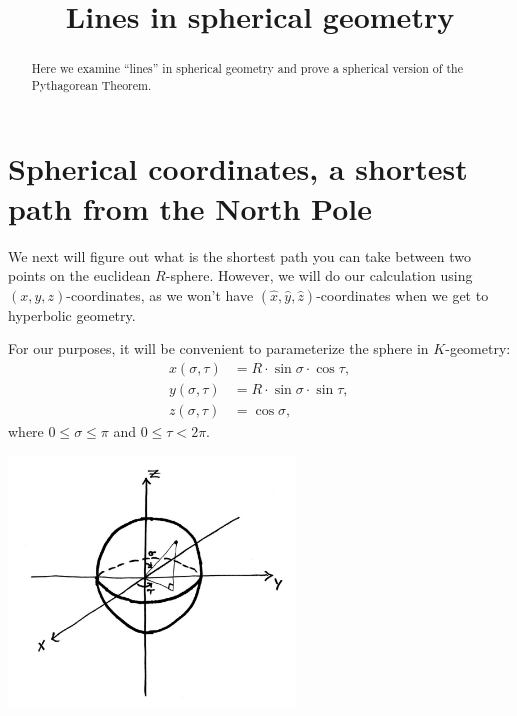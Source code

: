 \documentclass[newpage,hints,handout]{ximera}
\title{Lines in spherical geometry}
\begin{document}
\begin{abstract}
Here we examine ``lines'' in spherical geometry and prove a spherical
version of the Pythagorean Theorem.
\end{abstract}
\maketitle


\section{Spherical coordinates, a shortest path from the North Pole}

We next will figure out what is the shortest path you can take between
two points on the euclidean $R$-sphere. However, we will do our
calculation using $(x,y,z)$-coordinates, as we won't have
$(\hat{x},\hat{y},\hat{z})$-coordinates when we get to hyperbolic
geometry.

For our purposes, it will be convenient to parameterize the sphere in
$K$-geometry:%
\begin{align*}
x(\sigma,\tau) &=R\cdot \sin\sigma\cdot \cos \tau,\\
y(\sigma,\tau) &=R\cdot \sin\sigma\cdot \sin\tau,\\
z(\sigma,\tau) &=\cos \sigma,
\end{align*}
where $0\le \sigma\le\pi$ and $0\le \tau<2\pi$.

\begin{image}
  \includegraphics[width=3in]{spherePara.jpg}
\end{image}
\end{document}
